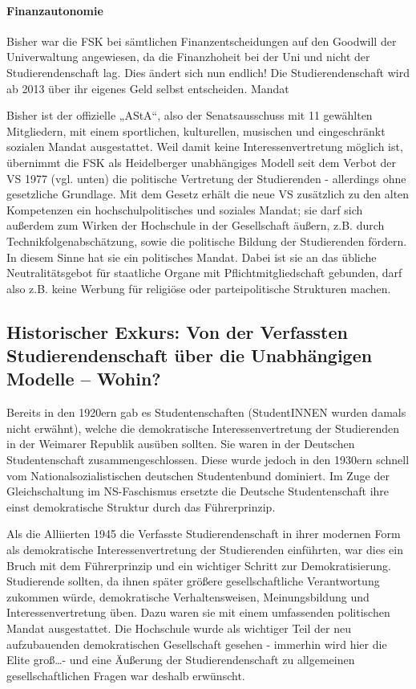 \paragraph{Finanzautonomie}

Bisher war die FSK bei sämtlichen Finanzentscheidungen auf den Goodwill der Univerwaltung angewiesen, da die Finanzhoheit bei der Uni und nicht der Studierendenschaft lag. Dies ändert sich nun endlich! Die Studierendenschaft wird ab 2013 über ihr eigenes Geld selbst entscheiden.
 Mandat

Bisher ist der offizielle „AStA“, also der Senatsausschuss mit 11 gewählten Mitgliedern, mit einem sportlichen, kulturellen, musischen und eingeschränkt sozialen Mandat ausgestattet. Weil damit keine Interessenvertretung möglich ist, übernimmt die FSK als Heidelberger unabhängiges Modell seit dem Verbot der VS 1977 (vgl. unten) die politische Vertretung der Studierenden - allerdings ohne gesetzliche Grundlage.
Mit dem Gesetz erhält die neue VS zusätzlich zu den alten Kompetenzen ein hochschulpolitisches und soziales Mandat; sie darf sich außerdem zum Wirken der Hochschule in der Gesellschaft äußern, z.B. durch Technikfolgenabschätzung, sowie die politische Bildung der Studierenden fördern. In diesem Sinne hat sie ein politisches Mandat. Dabei ist sie an das übliche Neutralitätsgebot für staatliche Organe mit Pflichtmitgliedschaft gebunden, darf also z.B. keine Werbung für religiöse oder parteipolitische Strukturen machen.

\subsection{Historischer Exkurs: Von der Verfassten Studierendenschaft über die Unabhängigen Modelle -- Wohin?}

Bereits in den 1920ern gab es Studentenschaften (StudentINNEN wurden damals nicht erwähnt), welche die demokratische Interessenvertretung der Studierenden in der Weimarer Republik ausüben sollten. Sie waren in der Deutschen Studentenschaft zusammengeschlossen. Diese wurde jedoch in den 1930ern schnell vom Nationalsozialistischen deutschen Studentenbund dominiert. Im Zuge der Gleichschaltung im NS-Faschismus ersetzte die Deutsche Studentenschaft ihre einst demokratische Struktur durch das Führerprinzip.

Als die Alliierten 1945 die Verfasste Studierendenschaft in ihrer modernen Form als demokratische Interessenvertretung der Studierenden einführten, war dies ein Bruch mit dem Führerprinzip und ein wichtiger Schritt zur Demokratisierung. Studierende sollten, da ihnen später größere gesellschaftliche Verantwortung zukommen würde, demokratische Verhaltensweisen, Meinungsbildung und Interessenvertretung üben. Dazu waren sie mit einem umfassenden politischen Mandat ausgestattet. Die Hochschule wurde als wichtiger Teil der neu aufzubauenden demokratischen Gesellschaft gesehen - immerhin wird hier die Elite groß\dots - und eine Äußerung der Studierendenschaft zu allgemeinen gesellschaftlichen Fragen war deshalb erwünscht.

